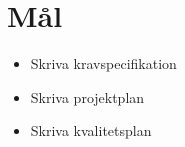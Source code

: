 \section{Mål}
\begin{itemize}
\item Skriva kravspecifikation
\item Skriva projektplan
\item Skriva kvalitetsplan
\end{itemize}